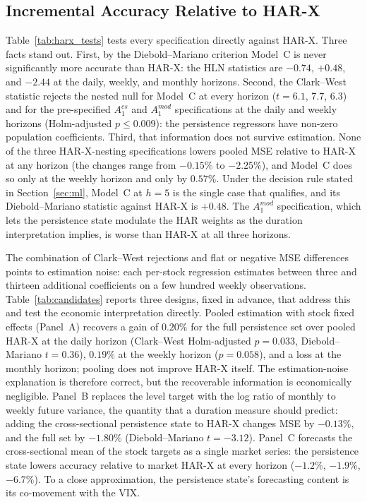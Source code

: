 \documentclass[jrfm,article,submit,moreauthors,pdftex]{Definitions/mdpi}
\begin{document}
\subsection{Incremental Accuracy Relative to HAR-X}
\label{subsec:beyond_harx}



Table~\ref{tab:harx_tests} tests every specification directly against
HAR-X. Three facts stand out. First, by the Diebold--Mariano criterion
Model~C is never significantly more accurate than HAR-X: the HLN statistics
are $-0.74$, $+0.48$, and $-2.44$ at the daily, weekly, and monthly
horizons. Second, the Clark--West statistic rejects the nested null for
Model~C at every horizon ($t = 6.1$, $7.7$, $6.3$) and for the pre-specified
$A_1^{cs}$ and $A_1^{mod}$ specifications at the daily and weekly horizons
(Holm-adjusted $p \le 0.009$): the persistence regressors have non-zero
population coefficients. Third, that information does not survive
estimation. None of the three HAR-X-nesting specifications lowers pooled
MSE relative to HAR-X at any horizon (the changes range from $-0.15\%$ to
$-2.25\%$), and Model~C does so only at the weekly horizon and only by
$0.57\%$. Under the decision rule stated in Section~\ref{sec:ml}, Model~C at
$h=5$ is the single case that qualifies, and its Diebold--Mariano statistic
against HAR-X is $+0.48$. The $A_1^{mod}$ specification, which lets the
persistence state modulate the HAR weights as the duration interpretation
implies, is worse than HAR-X at all three horizons.



The combination of Clark--West rejections and flat or negative MSE
differences points to estimation noise: each per-stock regression estimates
between three and thirteen additional coefficients on a few hundred weekly
observations. Table~\ref{tab:candidates} reports three designs, fixed in
advance, that address this and test the economic interpretation directly.
Pooled estimation with stock fixed effects (Panel~A) recovers a gain of
$0.20\%$ for the full persistence set over pooled HAR-X at the daily
horizon (Clark--West Holm-adjusted $p = 0.033$, Diebold--Mariano
$t = 0.36$), $0.19\%$ at the weekly horizon ($p = 0.058$), and a loss at
the monthly horizon; pooling does not improve HAR-X itself. The
estimation-noise explanation is therefore correct, but the recoverable
information is economically negligible. Panel~B replaces the level target
with the log ratio of monthly to weekly future variance, the quantity that
a duration measure should predict: adding the cross-sectional persistence
state to HAR-X changes MSE by $-0.13\%$, and the full set by $-1.80\%$
(Diebold--Mariano $t = -3.12$). Panel~C forecasts the cross-sectional mean
of the stock targets as a single market series: the persistence state
lowers accuracy relative to market HAR-X at every horizon ($-1.2\%$,
$-1.9\%$, $-6.7\%$). To a close approximation, the persistence state's
forecasting content is its co-movement with the VIX.
\end{document}
